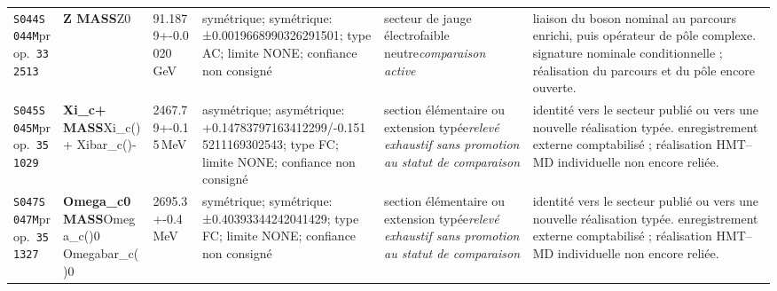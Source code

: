 \begin{landscape}
\begin{longtable}{L{1.85cm}L{4.45cm}L{2.35cm}L{4.05cm}L{3.35cm}L{7.15cm}}
\texttt{S044}\newline \texttt{S044M}\newline prop.\ \texttt{332513} & \textbf{Z MASS}\newline Z0 & 91.1879+-0.0020\,GeV & symétrique; symétrique: ±0.0019668990326291501; type AC; limite NONE; confiance non consigné & secteur de jauge électrofaible neutre\newline \emph{comparaison active} & liaison du boson nominal au parcours enrichi, puis opérateur de pôle complexe. signature nominale conditionnelle ; réalisation du parcours et du pôle encore ouverte. \\
\texttt{S045}\newline \texttt{S045M}\newline prop.\ \texttt{351029} & \textbf{Xi\_\allowbreak{}c+ MASS}\newline Xi\_\allowbreak{}c()+ \textbar{}\allowbreak{} Xibar\_\allowbreak{}c()- & 2467.79+-0.15\,MeV & asymétrique; asymétrique: +0.14783797163412299/-0.1515211169302543; type FC; limite NONE; confiance non consigné & section élémentaire ou extension typée\newline \emph{relevé exhaustif sans promotion au statut de comparaison} & identité vers le secteur publié ou vers une nouvelle réalisation typée. enregistrement externe comptabilisé ; réalisation HMT--MD individuelle non encore reliée. \\
\texttt{S047}\newline \texttt{S047M}\newline prop.\ \texttt{351327} & \textbf{Omega\_\allowbreak{}c0 MASS}\newline Omega\_\allowbreak{}c()0 \textbar{}\allowbreak{} Omegabar\_\allowbreak{}c()0 & 2695.3+-0.4\,MeV & symétrique; symétrique: ±0.40393344242041429; type FC; limite NONE; confiance non consigné & section élémentaire ou extension typée\newline \emph{relevé exhaustif sans promotion au statut de comparaison} & identité vers le secteur publié ou vers une nouvelle réalisation typée. enregistrement externe comptabilisé ; réalisation HMT--MD individuelle non encore reliée. \\

\end{longtable}
\end{landscape}
